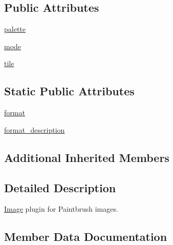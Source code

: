 \subsection*{Public Attributes}
\begin{DoxyCompactItemize}
\item 
\hyperlink{classPIL_1_1PcxImagePlugin_1_1PcxImageFile_a77e92d6178b37b48a601bd94b236148d}{palette}
\item 
\hyperlink{classPIL_1_1PcxImagePlugin_1_1PcxImageFile_a64afd76ae9ed193f12b9e8e3ee039add}{mode}
\item 
\hyperlink{classPIL_1_1PcxImagePlugin_1_1PcxImageFile_a58fd7b018f660a67999f8df20586b961}{tile}
\end{DoxyCompactItemize}
\subsection*{Static Public Attributes}
\begin{DoxyCompactItemize}
\item 
\hyperlink{classPIL_1_1PcxImagePlugin_1_1PcxImageFile_ad52970663e43ac01e637a5e85ee51556}{format}
\item 
\hyperlink{classPIL_1_1PcxImagePlugin_1_1PcxImageFile_ac21ef911385f89c4624d6633db670d50}{format\+\_\+description}
\end{DoxyCompactItemize}
\subsection*{Additional Inherited Members}


\subsection{Detailed Description}
\hyperlink{namespacePIL_1_1Image}{Image} plugin for Paintbrush images. 



\subsection{Member Data Documentation}
\mbox{\label{classPIL_1_1PcxImagePlugin_1_1PcxImageFile_ad52970663e43ac01e637a5e85ee51556}} 

